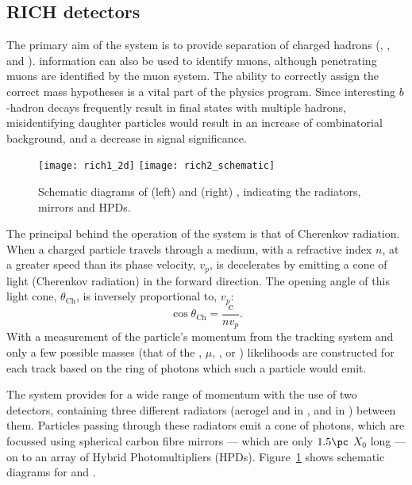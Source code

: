 \subsection{RICH detectors}

The primary aim of the \lhcb \rich system is to provide \pid separation of charged hadrons (\pion,
\kaon, and \proton).
\rich information can also be used to identify muons, although penetrating muons are identified by
the muon system.
The ability to correctly assign the correct mass hypotheses is a vital part of the \lhcb physics
program.
Since interesting $b$-hadron decays frequently result in final states with multiple hadrons,
misidentifying daughter particles would result in an increase of combinatorial background, and
a decrease in signal significance.

\begin{figure}
  \begin{center}
    \texttt{[image: rich1\_2d]}
    \texttt{[image: rich2\_schematic]}
    \caption[LHCb Ring Imaging Cherenkov detectors]
    {\small
      Schematic diagrams of (left) \richone and (right) \richtwo, indicating the radiators,
      mirrors and HPDs.
    }
    \label{fig:lhcb:rich}
  \end{center}
\end{figure}

The principal behind the operation of the \rich system is that of Cherenkov radiation.
When a charged particle travels through a medium, with a refractive index $n$, at a greater speed
than its phase velocity, $v_p$, is decelerates by emitting a cone of light (Cherenkov radiation) in
the forward direction.
The opening angle of this light cone, $\theta_\mathrm{Ch}$, is inversely proportional to, $v_p$:
\begin{equation}
  \cos\theta_\mathrm{Ch}=\frac{c}{nv_p}.
\end{equation}
With a measurement of the particle's momentum from the tracking system and only a few possible
masses (that of the \electron, $\mu$, \pion, \kaon or \proton) likelihoods are constructed for each
track based on the ring of photons which such a particle would emit.

The \lhcb \rich system provides \pid for a wide range of momentum with the use of two \rich
detectors, containing three different radiators (aerogel and \cfourften in
\richone, and \cffour in \richtwo) between them.
Particles passing through these radiators emit a cone of photons, which are focussed using
spherical carbon fibre mirrors --- which are only $1.5\pc$ $X_0$ long --- on to an array of Hybrid
Photomultipliers (HPDs).
Figure~\ref{fig:lhcb:rich} shows schematic diagrams for \richone and \richtwo.

